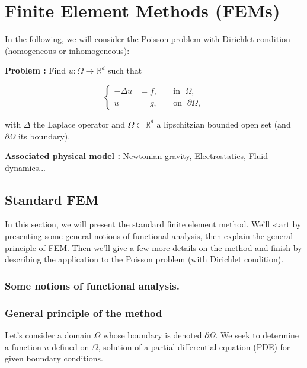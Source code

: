 \section{Finite Element Methods (FEMs)}
\graphicspath{{images/FEM}}

In the following, we will consider the Poisson problem with Dirichlet condition (homogeneous or inhomogeneous):

\textbf{Problem :} Find $u : \Omega \rightarrow \mathbb{R}^d$ such that

\begin{equation*}
	\left\{
		\begin{aligned}
			-\Delta u &= f, \; &&\text{in } \; \Omega, \\
			u&=g, \; &&\text{on } \; \partial\Omega,
		\end{aligned}
	\right.
\end{equation*}

with $\Delta$ the Laplace operator and $\Omega\subset\mathbb{R}^d$ a lipschitzian bounded open set (and $\partial\Omega$ its boundary).

\textbf{Associated physical model :} Newtonian gravity, Electrostatics, Fluid dynamics...


\subsection{Standard FEM}

In this section, we will present the standard finite element method. We'll start by presenting some general notions of functional analysis, then explain the general principle of FEM. Then we'll give a few more details on the method and finish by describing the application to the Poisson problem (with Dirichlet condition).

\subsubsection{Some notions of functional analysis.}


\subsubsection{General principle of the method}

Let's consider a domain $\Omega$ whose boundary is denoted $\partial\Omega$. We seek to determine a function $u$ defined on $\Omega$, solution of a partial differential equation (PDE) for given boundary conditions.


